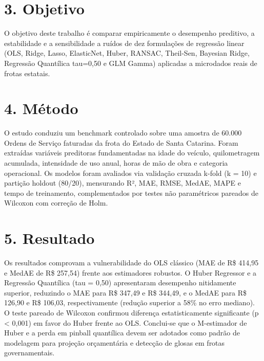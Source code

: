 \documentclass[10pt,a4paper,journal]{article}
\begin{document}
\section{3. Objetivo}
O objetivo deste trabalho é comparar empiricamente o desempenho preditivo, a estabilidade e a sensibilidade a ruídos de dez formulações de regressão linear (OLS, Ridge, Lasso, ElasticNet, Huber, RANSAC, Theil-Sen, Bayesian Ridge, Regressão Quantílica tau=0,50 e GLM Gamma) aplicadas a microdados reais de frotas estatais.

\section{4. Método}
O estudo conduziu um benchmark controlado sobre uma amostra de 60.000 Ordens de Serviço faturadas da frota do Estado de Santa Catarina. Foram extraídas variáveis preditoras fundamentadas na idade do veículo, quilometragem acumulada, intensidade de uso anual, horas de mão de obra e categoria operacional. Os modelos foram avaliados via validação cruzada k-fold (k = 10) e partição holdout (80/20), mensurando R², MAE, RMSE, MedAE, MAPE e tempo de treinamento, complementados por testes não paramétricos pareados de Wilcoxon com correção de Holm.

\section{5. Resultado}
Os resultados comprovam a vulnerabilidade do OLS clássico (MAE de R\$ 414,95 e MedAE de R\$ 257,54) frente aos estimadores robustos. O Huber Regressor e a Regressão Quantílica (tau = 0,50) apresentaram desempenho nitidamente superior, reduzindo o MAE para R\$ 347,49 e R\$ 344,49, e o MedAE para R\$ 126,90 e R\$ 106,03, respectivamente (redução superior a 58\% no erro mediano). O teste pareado de Wilcoxon confirmou diferença estatisticamente significante (p < 0,001) em favor do Huber frente ao OLS. Conclui-se que o M-estimador de Huber e a perda em pinball quantílica devem ser adotados como padrão de modelagem para projeção orçamentária e detecção de glosas em frotas governamentais.
\end{document}
